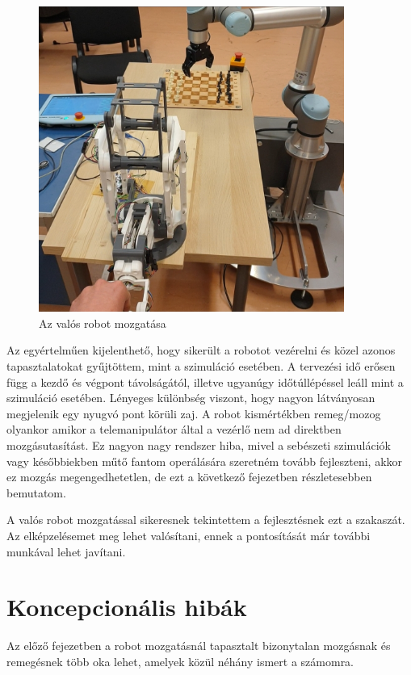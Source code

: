 \begin{figure}[!ht]
\centering
\includegraphics[width=100mm, keepaspectratio]{figures/Robot/Valosrobotszimulacio}
\caption{Az valós robot mozgatása}
\label{fig:valos_robot_mozgatas}
\end{figure}

Az egyértelműen kijelenthető, hogy sikerült a robotot vezérelni és közel azonos tapasztalatokat gyűjtöttem, mint a szimuláció esetében. A tervezési idő erősen függ a kezdő és végpont távolságától, illetve ugyanúgy időtúllépéssel leáll mint a szimuláció esetében. Lényeges különbség viszont, hogy nagyon látványosan megjelenik egy nyugvó pont körüli zaj. A robot kismértékben remeg/mozog olyankor amikor a telemanipulátor által a vezérlő nem ad direktben mozgásutasítást. Ez nagyon nagy rendszer hiba, mivel a sebészeti szimulációk vagy későbbiekben műtő fantom operálására szeretném tovább fejleszteni, akkor ez mozgás megengedhetetlen, de ezt a következő fejezetben részletesebben bemutatom.

A valós robot mozgatással sikeresnek tekintettem a fejlesztésnek ezt a szakaszát. Az elképzelésemet meg lehet valósítani, ennek a pontosítását már további munkával lehet javítani. 

\section{Koncepcionális hibák}

Az előző fejezetben a robot mozgatásnál tapasztalt bizonytalan mozgásnak és remegésnek több oka lehet, amelyek közül néhány ismert a számomra.

